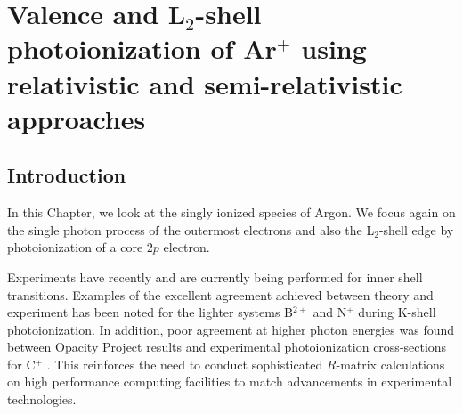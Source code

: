 
\chapter{Valence and L$_{2}$-shell photoionization of Ar$^+$ using relativistic and semi-relativistic approaches} %

\label{cha:argon} %




\section{Introduction}\label{sec:arg_introduction}
In this Chapter, we look at the singly ionized species of Argon. We focus again on the single photon process of the outermost electrons and also the L$_{2}$-shell edge by photoionization of a core $2p$ electron.


Experiments have recently and are currently being performed for inner shell transitions. Examples of the excellent agreement achieved between theory and experiment has been noted for the lighter systems B$^{2+}$ and N$^{+}$ \citep{2010JPhB...43m5602M, 2011JPhB...44q5208G} during K-shell photoionization. In addition, poor agreement at higher photon energies was found between Opacity Project results and experimental photoionization cross-sections for C$^{+}$ \citep{2001ApJS..135..285K}. This reinforces the need to conduct sophisticated $R$-matrix calculations on high performance computing facilities to match advancements in experimental technologies.

